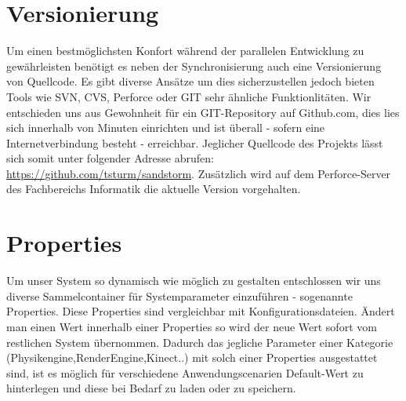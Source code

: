 \begin{Spacing}{\mylinespace}
\section{Versionierung}
Um einen bestmöglichsten Konfort während der parallelen Entwicklung zu gewährleisten benötigt es neben der Synchronisierung auch eine Versionierung von Quellcode. Es gibt diverse Ansätze um dies sicherzustellen jedoch bieten Tools wie SVN, CVS, Perforce oder GIT sehr ähnliche Funktionlitäten. Wir entschieden uns aus Gewohnheit für ein GIT-Repository auf Github.com, dies lies sich innerhalb von Minuten einrichten und ist überall - sofern eine Internetverbindung besteht - erreichbar. Jeglicher Quellcode des Projekts lässt sich somit unter folgender Adresse abrufen: \url{https://github.com/tsturm/sandstorm}. Zusätzlich wird auf dem Perforce-Server des Fachbereichs Informatik die aktuelle Version vorgehalten.


\section{Properties}
Um unser System so dynamisch wie möglich zu gestalten entschlossen wir uns diverse Sammelcontainer für Systemparameter einzuführen - sogenannte Properties.
Diese Properties sind vergleichbar mit Konfigurationsdateien. Ändert man einen Wert innerhalb einer Properties so wird der neue Wert sofort vom restlichen System übernommen.
Dadurch das jegliche Parameter einer Kategorie (Physikengine,RenderEngine,Kinect..) mit solch einer Properties ausgestattet sind, ist es möglich für verschiedene Anwendungscenarien Default-Wert zu hinterlegen und diese bei Bedarf zu laden oder zu speichern.

\end{Spacing}
\newpage
\clearpage

